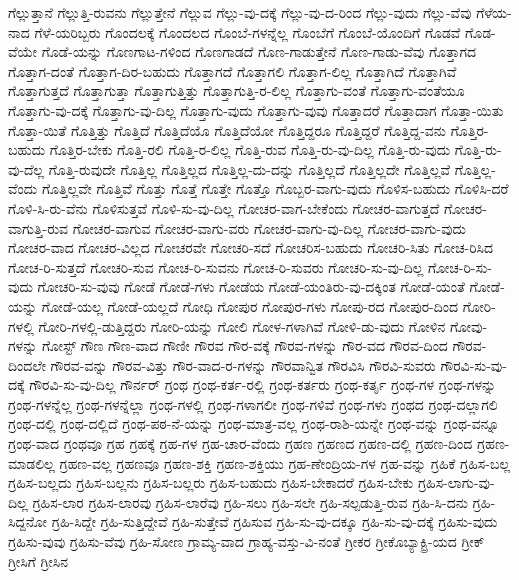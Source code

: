 {ಗೆಲ್ಲುತ್ತಾನೆ
ಗೆಲ್ಲುತ್ತಿ-ರುವನು
ಗೆಲ್ಲುತ್ತೇನೆ
ಗೆಲ್ಲುವ
ಗೆಲ್ಲು-ವು-ದಕ್ಕೆ
ಗೆಲ್ಲು-ವು-ದ-ರಿಂದ
ಗೆಲ್ಲು-ವುದು
ಗೆಲ್ಲು-ವೆವು
ಗೆಳೆಯ-ನಾದ
ಗೆಳೆ-ಯರಿಬ್ಬರು
ಗೊಂದಲಕ್ಕೆ
ಗೊಂದಲದ
ಗೊಂಬೆ-ಗಳನ್ನೆಲ್ಲ
ಗೊಂಬೆಗೆ
ಗೊಂಬೆ-ಯೊಂದಿಗೆ
ಗೊಡವೆ
ಗೊಡ-ವೆಯೇ
ಗೊಡೆ-ಯನ್ನು
ಗೊಣಗಾಟ-ಗಳಿಂದ
ಗೊಣಗಾಡದೆ
ಗೊಣ-ಗಾಡುತ್ತೇನೆ
ಗೊಣ-ಗಾಡು-ವೆವು
ಗೊತ್ತಾಗದ
ಗೊತ್ತಾಗ-ದಂತೆ
ಗೊತ್ತಾಗ-ದಿರ-ಬಹುದು
ಗೊತ್ತಾಗದೆ
ಗೊತ್ತಾಗಲಿ
ಗೊತ್ತಾಗ-ಲಿಲ್ಲ
ಗೊತ್ತಾಗಿದೆ
ಗೊತ್ತಾಗಿವೆ
ಗೊತ್ತಾಗುತ್ತದೆ
ಗೊತ್ತಾಗುತ್ತಾ
ಗೊತ್ತಾಗುತ್ತಿತ್ತು
ಗೊತ್ತಾಗುತ್ತಿ-ರ-ಲಿಲ್ಲ
ಗೊತ್ತಾಗು-ವಂತೆ
ಗೊತ್ತಾಗು-ವಂತೆಯೂ
ಗೊತ್ತಾಗು-ವು-ದಕ್ಕೆ
ಗೊತ್ತಾಗು-ವು-ದಿಲ್ಲ
ಗೊತ್ತಾಗು-ವುದು
ಗೊತ್ತಾಗು-ವುವು
ಗೊತ್ತಾದರೆ
ಗೊತ್ತಾದಾಗ
ಗೊತ್ತಾ-ಯಿತು
ಗೊತ್ತಾ-ಯಿತೆ
ಗೊತ್ತಿತ್ತು
ಗೊತ್ತಿದೆ
ಗೊತ್ತಿದೆಯೊ
ಗೊತ್ತಿದೆಯೋ
ಗೊತ್ತಿದ್ದರೂ
ಗೊತ್ತಿದ್ದರೆ
ಗೊತ್ತಿದ್ದ-ವನು
ಗೊತ್ತಿರ-ಬಹುದು
ಗೊತ್ತಿರ-ಬೇಕು
ಗೊತ್ತಿ-ರಲಿ
ಗೊತ್ತಿ-ರ-ಲಿಲ್ಲ
ಗೊತ್ತಿ-ರುವ
ಗೊತ್ತಿ-ರು-ವು-ದಿಲ್ಲ
ಗೊತ್ತಿ-ರು-ವುದು
ಗೊತ್ತಿ-ರು-ವು-ದೆಲ್ಲ
ಗೊತ್ತಿ-ರುವುದೇ
ಗೊತ್ತಿಲ್ಲ
ಗೊತ್ತಿಲ್ಲದ
ಗೊತ್ತಿಲ್ಲ-ದು-ದನ್ನು
ಗೊತ್ತಿಲ್ಲದೆ
ಗೊತ್ತಿಲ್ಲದೇ
ಗೊತ್ತಿಲ್ಲವೆ
ಗೊತ್ತಿಲ್ಲ-ವೆಂದು
ಗೊತ್ತಿಲ್ಲವೇ
ಗೊತ್ತಿವೆ
ಗೊತ್ತು
ಗೊತ್ತೆ
ಗೊತ್ತೇ
ಗೊತ್ತೊ
ಗೊಬ್ಬರ-ವಾಗು-ವುದು
ಗೊಳಿಸ-ಬಹುದು
ಗೊಳಿಸಿ-ದರೆ
ಗೊಳಿ-ಸಿ-ರು-ವೆನು
ಗೊಳಿಸುತ್ತವೆ
ಗೊಳಿ-ಸು-ವು-ದಿಲ್ಲ
ಗೋಚರ-ವಾಗ-ಬೇಕೆಂದು
ಗೋಚರ-ವಾಗುತ್ತದೆ
ಗೋಚರ-ವಾಗುತ್ತಿ-ರುವ
ಗೋಚರ-ವಾಗುವ
ಗೋಚರ-ವಾಗು-ವರು
ಗೋಚರ-ವಾಗು-ವು-ದಿಲ್ಲ
ಗೋಚರ-ವಾಗು-ವುದು
ಗೋಚರ-ವಾದ
ಗೋಚರ-ವಿಲ್ಲದ
ಗೋಚರವೇ
ಗೋಚರಿ-ಸದೆ
ಗೋಚರಿಸ-ಬಹುದು
ಗೋಚರಿ-ಸಿತು
ಗೋಚ-ರಿಸಿದ
ಗೋಚ-ರಿ-ಸುತ್ತದೆ
ಗೋಚರಿ-ಸುವ
ಗೋಚ-ರಿ-ಸುವನು
ಗೋಚ-ರಿ-ಸುವರು
ಗೋಚರಿ-ಸು-ವು-ದಿಲ್ಲ
ಗೋಚ-ರಿ-ಸು-ವುದು
ಗೋಚರಿ-ಸು-ವುವು
ಗೋಡೆ
ಗೋಡೆ-ಗಳು
ಗೋಡೆಯ
ಗೋಡೆ-ಯಂತಿರು-ವು-ದಕ್ಕಿಂತ
ಗೋಡೆ-ಯಂತೆ
ಗೋಡೆ-ಯನ್ನು
ಗೋಡೆ-ಯಲ್ಲ
ಗೋಡೆ-ಯಲ್ಲದೆ
ಗೋಧಿ
ಗೋಪುರ
ಗೋಪುರ-ಗಳು
ಗೋಪು-ರದ
ಗೋಪುರ-ದಿಂದ
ಗೋರಿ-ಗಳಲ್ಲಿ
ಗೋರಿ-ಗಳಲ್ಲಿ-ಡುತ್ತಿದ್ದರು
ಗೋರಿ-ಯನ್ನು
ಗೋಲಿ
ಗೋಳ-ಗಳಾಗಿವೆ
ಗೋಳಿ-ಡು-ವುದು
ಗೋಳಿನ
ಗೋವು-ಗಳನ್ನು
ಗೋಸ್ಟ್
ಗೌಣ
ಗೌಣ-ವಾದ
ಗೌಣೀ
ಗೌರವ
ಗೌರ-ವಕ್ಕೆ
ಗೌರವ-ಗಳನ್ನು
ಗೌರ-ವದ
ಗೌರವ-ದಿಂದ
ಗೌರವ-ದಿಂದಲೇ
ಗೌರವ-ವನ್ನು
ಗೌರವ-ವಿತ್ತು
ಗೌರ-ವಾದ-ರ-ಗಳನ್ನು
ಗೌರವಾನ್ವಿತ
ಗೌರವಿಸಿ
ಗೌರವಿ-ಸುವರು
ಗೌರವಿ-ಸು-ವು-ದಕ್ಕೆ
ಗೌರವಿ-ಸು-ವು-ದಿಲ್ಲ
ಗೌರ್ನರ್
ಗ್ರಂಥ
ಗ್ರಂಥ-ಕರ್ತ-ರಲ್ಲಿ
ಗ್ರಂಥ-ಕರ್ತರು
ಗ್ರಂಥ-ಕರ್ತೃ
ಗ್ರಂಥ-ಗಳ
ಗ್ರಂಥ-ಗಳನ್ನು
ಗ್ರಂಥ-ಗಳನ್ನೆಲ್ಲ
ಗ್ರಂಥ-ಗಳನ್ನೆಲ್ಲಾ
ಗ್ರಂಥ-ಗಳಲ್ಲಿ
ಗ್ರಂಥ-ಗಳಾಗಲೀ
ಗ್ರಂಥ-ಗಳಿವೆ
ಗ್ರಂಥ-ಗಳು
ಗ್ರಂಥದ
ಗ್ರಂಥ-ದಲ್ಲಾಗಲಿ
ಗ್ರಂಥ-ದಲ್ಲಿ
ಗ್ರಂಥ-ದಲ್ಲಿದೆ
ಗ್ರಂಥ-ಪಠ-ನೆ-ಯನ್ನು
ಗ್ರಂಥ-ಮಾತ್ರ-ವಲ್ಲ
ಗ್ರಂಥ-ರಾಶಿ-ಯನ್ನೇ
ಗ್ರಂಥ-ವನ್ನು
ಗ್ರಂಥ-ವನ್ನೂ
ಗ್ರಂಥ-ವಾದ
ಗ್ರಂಥವೂ
ಗ್ರಹ
ಗ್ರಹಕ್ಕೆ
ಗ್ರಹ-ಗಳ
ಗ್ರಹ-ಚಾರ-ವೆಂದು
ಗ್ರಹಣ
ಗ್ರಹಣದ
ಗ್ರಹಣ-ದಲ್ಲಿ
ಗ್ರಹಣ-ದಿಂದ
ಗ್ರಹಣ-ಮಾಡಲಿಲ್ಲ
ಗ್ರಹಣ-ವಲ್ಲ
ಗ್ರಹಣವೂ
ಗ್ರಹಣ-ಶಕ್ತಿ
ಗ್ರಹಣ-ಶಕ್ತಿಯು
ಗ್ರಹ-ಣೇಂದ್ರಿಯ-ಗಳ
ಗ್ರಹ-ವನ್ನು
ಗ್ರಹಿಕೆ
ಗ್ರಹಿಸ-ಬಲ್ಲ
ಗ್ರಹಿಸ-ಬಲ್ಲದು
ಗ್ರಹಿಸ-ಬಲ್ಲನು
ಗ್ರಹಿಸ-ಬಲ್ಲರು
ಗ್ರಹಿಸ-ಬಹುದು
ಗ್ರಹಿಸ-ಬೇಕಾದರೆ
ಗ್ರಹಿಸ-ಬೇಕು
ಗ್ರಹಿಸ-ಲಾಗು-ವು-ದಿಲ್ಲ
ಗ್ರಹಿಸ-ಲಾರ
ಗ್ರಹಿಸ-ಲಾರವು
ಗ್ರಹಿಸ-ಲಾರೆವು
ಗ್ರಹಿ-ಸಲು
ಗ್ರಹಿ-ಸಲೇ
ಗ್ರಹಿ-ಸಲ್ಪಡುತ್ತಿ-ರುವ
ಗ್ರಹಿ-ಸಿ-ದನು
ಗ್ರಹಿ-ಸಿದ್ದನೋ
ಗ್ರಹಿ-ಸಿದ್ದೇ
ಗ್ರಹಿ-ಸುತ್ತಿದ್ದೇವೆ
ಗ್ರಹಿ-ಸುತ್ತೇವೆ
ಗ್ರಹಿಸುವ
ಗ್ರಹಿ-ಸು-ವು-ದಕ್ಕೂ
ಗ್ರಹಿ-ಸು-ವು-ದಕ್ಕೆ
ಗ್ರಹಿಸು-ವುದು
ಗ್ರಹಿಸು-ವುವು
ಗ್ರಹಿಸು-ವೆವು
ಗ್ರಹಿ-ಸೋಣ
ಗ್ರಾಮ್ಯ-ವಾದ
ಗ್ರಾಹ್ಯ-ವಸ್ತು-ವಿ-ನಂತೆ
ಗ್ರೀಕರ
ಗ್ರೀಕೊಬ್ಯಾಕ್ಟ್ರಿ-ಯದ
ಗ್ರೀಕ್
ಗ್ರೀಸಿಗೆ
ಗ್ರೀಸಿನ
}
